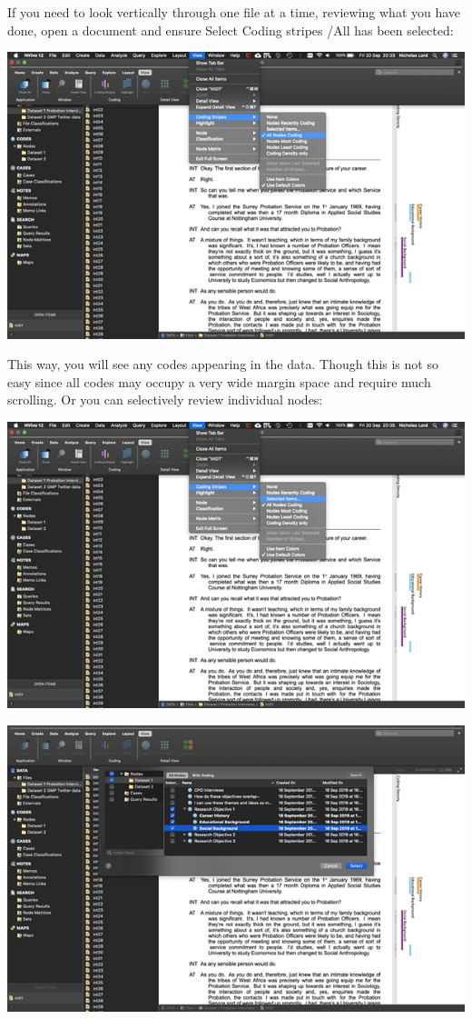 \documentclass[
]{book}
\begin{document}
If you need to look vertically through one file at a time, reviewing what you have done, open a document and ensure Select Coding stripes /All has been selected:

\includegraphics{imgs/abductive.png}

This way, you will see any codes appearing in the data. Though this is not so easy since all codes may occupy a very wide margin space and require much scrolling. Or you can selectively review individual nodes:

\includegraphics{imgs/select_items.png}

\includegraphics{imgs/select_items2.png}
\end{document}
